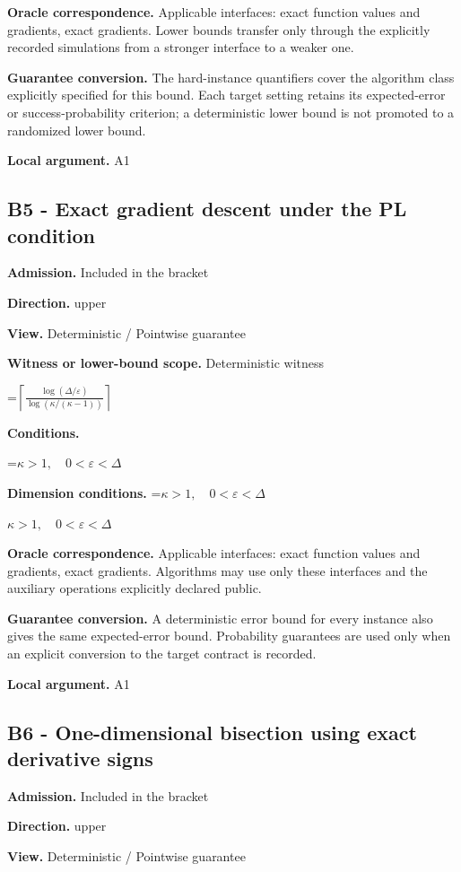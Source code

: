\documentclass[10pt,a4paper]{article}
\newcommand{\AtlasMath}[1]{\par\begingroup\centering\setbox0=\hbox{$\displaystyle #1$}\ifdim\wd0>1.4\linewidth\typeout{ATLAS WIDE FORMULA: \the\wd0}\fi\ifdim\wd0>\linewidth\resizebox{\linewidth}{!}{\box0}\else\box0\fi\par\endgroup}
\newcommand{\AtlasInlineMath}[1]{\begingroup\setbox0=\hbox{$#1$}\ifdim\wd0>.4\linewidth\endgroup\AtlasMath{#1}\else\endgroup$#1$\fi}
\begin{document}
\textbf{Oracle correspondence.} Applicable interfaces: exact function values and gradients, exact gradients. Lower bounds transfer only through the explicitly recorded simulations from a stronger interface to a weaker one.

\textbf{Guarantee conversion.} The hard-instance quantifiers cover the algorithm class explicitly specified for this bound. Each target setting retains its expected-error or success-probability criterion; a deterministic lower bound is not promoted to a randomized lower bound.

\textbf{Local argument.} A1

\subsection{B5 - Exact gradient descent under the PL condition}
\textbf{Admission.} Included in the bracket

\textbf{Direction.} upper

\textbf{View.} Deterministic / Pointwise guarantee

\textbf{Witness or lower-bound scope.} Deterministic witness

\AtlasMath{\left\lceil\frac{\log(\Delta/\varepsilon)}{\log(\kappa/(\kappa-1))}\right\rceil}
\textbf{Conditions.} 
\AtlasMath{\kappa>1,\quad0<\varepsilon<\Delta}


\textbf{Dimension conditions.} \AtlasInlineMath{\kappa>1,\quad0<\varepsilon<\Delta}

\textbf{Oracle correspondence.} Applicable interfaces: exact function values and gradients, exact gradients. Algorithms may use only these interfaces and the auxiliary operations explicitly declared public.

\textbf{Guarantee conversion.} A deterministic error bound for every instance also gives the same expected-error bound. Probability guarantees are used only when an explicit conversion to the target contract is recorded.

\textbf{Local argument.} A1

\subsection{B6 - One-dimensional bisection using exact derivative signs}
\textbf{Admission.} Included in the bracket

\textbf{Direction.} upper

\textbf{View.} Deterministic / Pointwise guarantee
\end{document}
